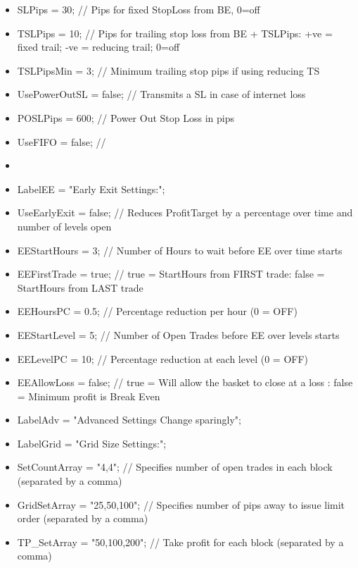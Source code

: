 \begin{itemize}
\item SLPips              = 30;       // Pips for fixed StopLoss from BE, 0=off
\item TSLPips             = 10;       // Pips for trailing stop loss from BE + TSLPips: +ve = fixed trail; -ve = reducing trail; 0=off
\item TSLPipsMin          = 3;        // Minimum trailing stop pips if using reducing TS
\item UsePowerOutSL       = false;    // Transmits a SL in case of internet loss
\item POSLPips            = 600;      // Power Out Stop Loss in pips
\item UseFIFO             = false;    // 
\item 
\item LabelEE             = "Early Exit Settings:";
\item UseEarlyExit        = false;    // Reduces ProfitTarget by a percentage over time and number of levels open
\item EEStartHours        = 3;        // Number of Hours to wait before EE over time starts
\item EEFirstTrade        = true;     // true = StartHours from FIRST trade: false = StartHours from LAST trade
\item EEHoursPC           = 0.5;      // Percentage reduction per hour (0 = OFF)
\item EEStartLevel        = 5;        // Number of Open Trades before EE over levels starts
\item EELevelPC           = 10;       // Percentage reduction at each level (0 = OFF)
\item EEAllowLoss         = false;    // true = Will allow the basket to close at a loss : false = Minimum profit is Break Even

\item LabelAdv            = "Advanced Settings Change sparingly";

\item LabelGrid           = "Grid Size Settings:";
\item SetCountArray       = "4,4";    // Specifies number of open trades in each block (separated by a comma)
\item GridSetArray        = "25,50,100"; // Specifies number of pips away to issue limit order (separated by a comma)
\item TP\_SetArray         = "50,100,200"; // Take profit for each block (separated by a comma)


\end{itemize}
